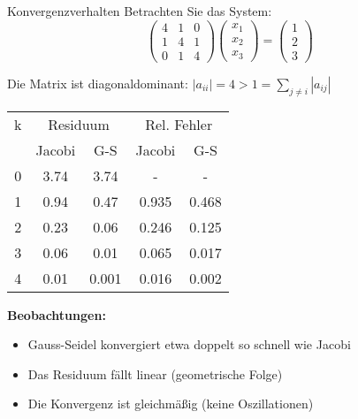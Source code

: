 \begin{example2}{Konvergenzverhalten}
Betrachten Sie das System:
$$\begin{pmatrix}
4 & 1 & 0\\
1 & 4 & 1\\
0 & 1 & 4
\end{pmatrix}
\begin{pmatrix}
x_1\\
x_2\\
x_3
\end{pmatrix} =
\begin{pmatrix}
1\\
2\\
3
\end{pmatrix}$$

Die Matrix ist diagonaldominant:
$|a_{ii}| = 4 > 1 = \sum_{j\neq i} |a_{ij}|$

\begin{center}
\begin{tabular}{c|cc|cc}
k & \multicolumn{2}{c|}{Residuum} & \multicolumn{2}{c}{Rel. Fehler}\\
& Jacobi & G-S & Jacobi & G-S\\
\hline
0 & 3.74 & 3.74 & - & -\\
1 & 0.94 & 0.47 & 0.935 & 0.468\\
2 & 0.23 & 0.06 & 0.246 & 0.125\\
3 & 0.06 & 0.01 & 0.065 & 0.017\\
4 & 0.01 & 0.001 & 0.016 & 0.002
\end{tabular}
\end{center}

\textbf{Beobachtungen:}
\begin{itemize}
    \item Gauss-Seidel konvergiert etwa doppelt so schnell wie Jacobi
    \item Das Residuum fällt linear (geometrische Folge)
    \item Die Konvergenz ist gleichmäßig (keine Oszillationen)
\end{itemize}
\end{example2}

